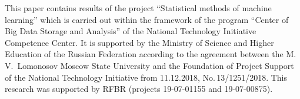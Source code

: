 



\vspace*{-6pt}

\Ack
\noindent
This paper contains results of the project ``Statistical methods of machine learning'' 
which is carried out within the framework of the program ``Center of Big Data Storage and Analysis'' 
of the National Technology Initiative Competence Center. It is supported by the Ministry 
of Science and Higher Education of the Russian Federation according to the agreement 
between the M.\,V.~Lomonosov Moscow State University and the Foundation of Project Support 
of the National Technology Initiative from 11.12.2018, No.\,13/1251/2018. 
This research was supported by RFBR (projects 19-07-01155 and 19-07-00875).

\vspace*{9pt}

